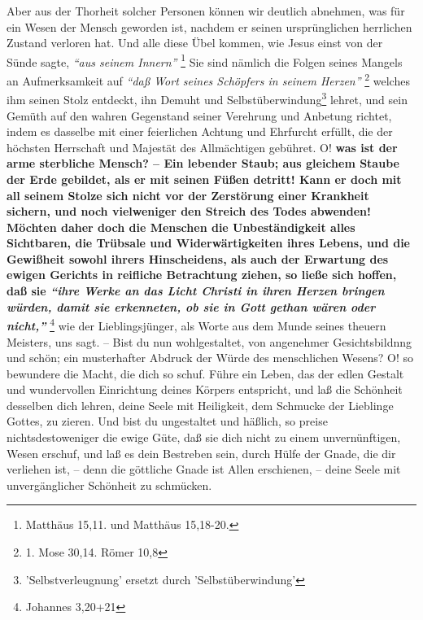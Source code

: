 Aber aus der Thorheit solcher Personen können wir deutlich abnehmen, was für ein
Wesen der Mensch geworden ist, nachdem er seinen ursprünglichen herrlichen
Zustand verloren hat. Und alle diese Übel kommen, wie Jesus einst von der
Sünde
sagte,
\textit{"`aus seinem Innern"'}
\footnote{Matthäus 15,11. und Matthäus 15,18-20.}
Sie sind nämlich
die Folgen seines Mangels an Aufmerksamkeit auf
\textit{"`daß Wort seines Schöpfers in
seinem Herzen"'}
\footnote{1. Mose 30,14. Römer 10,8}
welches ihm seinen Stolz
entdeckt, ihn Demuht und
Selbstüberwindung\footnote{'Selbstverleugnung' ersetzt durch
'Selbstüberwindung'} lehret, und sein Gemüth auf den
wahren Gegenstand seiner Verehrung und Anbetung richtet, indem es dasselbe mit
einer feierlichen Achtung und Ehrfurcht erfüllt, die der höchsten Herrschaft und
Majestät des Allmächtigen gebühret. O!  
\textbf{was ist der arme sterbliche Mensch? --
Ein lebender Staub; aus gleichem Staube der Erde gebildet, als er mit seinen
Füßen detritt! Kann er doch mit all seinem Stolze sich nicht vor der Zerstörung
einer Krankheit sichern, und noch vielweniger den Streich des Todes abwenden!
Möchten daher doch die Menschen die Unbeständigkeit alles Sichtbaren, die
Trübsale und Widerwärtigkeiten ihres Lebens, und die Gewißheit sowohl ihrers
Hinscheidens, als auch der Erwartung des ewigen Gerichts in reifliche
Betrachtung ziehen, so ließe sich hoffen, daß sie
\textit{"`ihre Werke an das Licht
Christi in ihren Herzen bringen würden, damit sie erkenneten, ob sie in Gott
gethan wären oder nicht,"'} }
\footnote{Johannes 3,20+21}
wie der Lieblingsjünger, als
Worte aus dem Munde seines theuern Meisters, uns sagt. -- Bist du nun
wohlgestaltet, von angenehmer Gesichtsbildnng und schön; ein musterhafter
Abdruck der Würde des menschlichen Wesens? O! so bewundere die Macht, die dich
so schuf. Führe ein Leben, das der edlen Gestalt und wundervollen Einrichtung
deines Körpers entspricht, und laß die Schönheit desselben dich lehren, deine
Seele mit Heiligkeit, dem Schmucke der
Lieblinge Gottes, zu zieren. Und bist du
ungestaltet und häßlich, so preise nichtsdestoweniger die ewige Güte, daß sie
dich nicht zu einem unvernünftigen, Wesen erschuf, und laß es dein Bestreben
sein, durch Hülfe der Gnade, die dir verliehen ist, --  denn die
göttliche Gnade
ist Allen erschienen, -- deine Seele mit unvergänglicher Schönheit zu schmücken.
